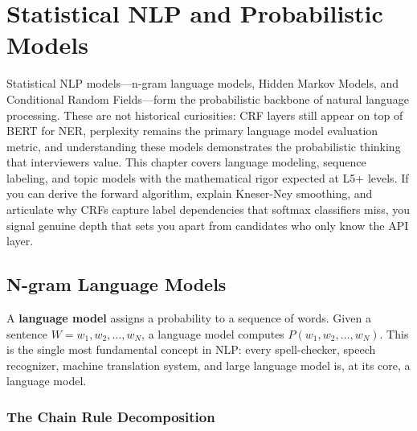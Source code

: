 
\chapter{Statistical NLP and Probabilistic Models}
\label{chap:statistical_nlp}

\begin{tldr}
Statistical NLP models---n-gram language models, Hidden Markov Models, and
Conditional Random Fields---form the probabilistic backbone of natural language
processing.  These are not historical curiosities: CRF layers still appear on
top of BERT for NER, perplexity remains the primary language model evaluation
metric, and understanding these models demonstrates the probabilistic thinking
that interviewers value.  This chapter covers language modeling, sequence
labeling, and topic models with the mathematical rigor expected at L5+ levels.
If you can derive the forward algorithm, explain Kneser-Ney smoothing, and
articulate why CRFs capture label dependencies that softmax classifiers miss,
you signal genuine depth that sets you apart from candidates who only know the
API layer.
\end{tldr}

\bigskip

\section{N-gram Language Models}
\label{sec:ngram_lm}

A \textbf{language model} assigns a probability to a sequence of words.  Given
a sentence $W = w_1, w_2, \ldots, w_N$, a language model computes
$P(w_1, w_2, \ldots, w_N)$.  This is the single most fundamental concept in
NLP: every spell-checker, speech recognizer, machine translation system, and
large language model is, at its core, a language model.

\subsection{The Chain Rule Decomposition}

